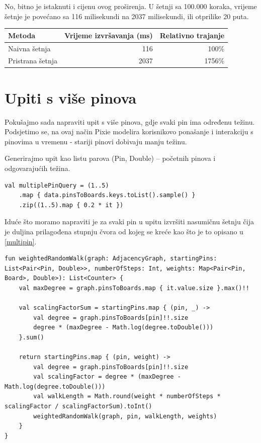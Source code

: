 \documentclass[times, utf8, seminar]{fer}
\begin{document}
No, bitno je istaknuti i cijenu ovog proširenja. U šetnji sa 100.000 koraka, vrijeme šetnje je povećano sa 116 milisekundi na 2037 milisekundi, ili otprilike 20 puta.

\begin{center}
		  \begin{tabular}{ |l|r|r| }
					 \hline
					 Metoda & Vrijeme izvršavanja (ms) & Relativno trajanje\\
					 \hline
					 Naivna šetnja & 116 & 100\% \\
					 \hline
					 Pristrana šetnja & 2037 & 1756\% \\
					 \hline
		  \end{tabular}
\end{center}

\section{Upiti s više pinova}

Pokušajmo sada napraviti upit s više pinova, gdje svaki pin ima određenu težinu. Podsjetimo se, na ovaj način Pixie modelira korisnikovo ponašanje i interakciju s pinovima u vremenu - stariji pinovi dobivaju manju težinu.

Generirajmo upit kao listu parova (Pin, Double) -- početnih pinova i odgovarajućih težina.

\begin{lstlisting}
val multiplePinQuery = (1..5)
	.map { data.pinsToBoards.keys.toList().sample() }
	.zip((1..5).map { 0.2 * it })
\end{lstlisting}

Iduće što moramo napraviti je za svaki pin u upitu izvršiti nasumičnu šetnju čija je duljina prilagođena stupnju čvora od kojeg se kreće kao što je to opisano u \ref{multipin}.

\begin{lstlisting}
fun weightedRandomWalk(graph: AdjacencyGraph, startingPins: List<Pair<Pin, Double>>, numberOfSteps: Int, weights: Map<Pair<Pin, Board>, Double>): List<Counter> {
    val maxDegree = graph.pinsToBoards.map { it.value.size }.max()!!

    val scalingFactorSum = startingPins.map { (pin, _) ->
        val degree = graph.pinsToBoards[pin]!!.size
        degree * (maxDegree - Math.log(degree.toDouble()))
    }.sum()

    return startingPins.map { (pin, weight) ->
        val degree = graph.pinsToBoards[pin]!!.size
        val scalingFactor = degree * (maxDegree - Math.log(degree.toDouble()))
        val walkLength = Math.round(weight * numberOfSteps * scalingFactor / scalingFactorSum).toInt()
        weightedRandomWalk(graph, pin, walkLength, weights)
    }
}
\end{lstlisting}
\end{document}
